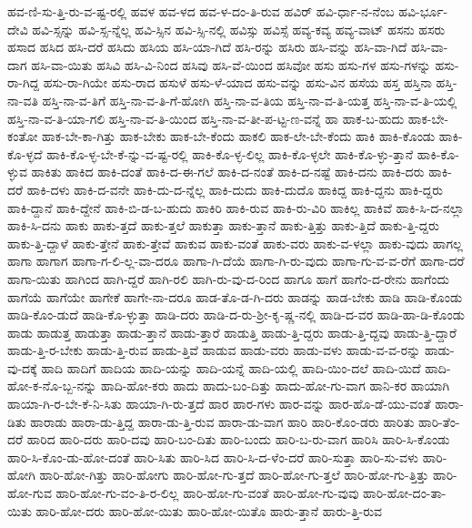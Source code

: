 {ಹವ-ಣಿ-ಸು-ತ್ತಿ-ರು-ವ-ಷ್ಟ-ರಲ್ಲಿ
ಹವಳ
ಹವ-ಳದ
ಹವ-ಳ-ದಂ-ತಿ-ರುವ
ಹವಿರ್
ಹವಿ-ರ್ಧಾ-ನ-ನೆಂಬ
ಹವಿ-ರ್ಭೂ-ದೇವಿ
ಹವಿ-ಸ್ಸನ್ನು
ಹವಿ-ಸ್ಸ-ನ್ನೆಲ್ಲ
ಹವಿ-ಸ್ಸಿನ
ಹವಿ-ಸ್ಸಿ-ನಲ್ಲಿ
ಹವಿಸ್ಸು
ಹವಿಸ್ಸೆ
ಹವ್ಯ-ಕವ್ಯ
ಹವ್ಯ-ವಾಟ್
ಹಸನು
ಹಸರು
ಹಸಾದ
ಹಸಿದ
ಹಸಿ-ದರೆ
ಹಸಿದು
ಹಸಿಯ
ಹಸಿ-ಯಾ-ಗಿದೆ
ಹಸಿ-ರನ್ನು
ಹಸಿರು
ಹಸಿ-ವನ್ನು
ಹಸಿ-ವಾ-ಗಿದೆ
ಹಸಿ-ವಾ-ದಾಗ
ಹಸಿ-ವಾ-ಯಿತು
ಹಸಿವಿ
ಹಸಿ-ವಿ-ನಿಂದ
ಹಸಿವು
ಹಸಿ-ವೆ-ಯಿಂದ
ಹಸಿವೋ
ಹಸು
ಹಸು-ಗಳ
ಹಸು-ಗಳನ್ನು
ಹಸು-ರಾ-ಗಿದ್ದ
ಹಸು-ರಾ-ಗಿಯೇ
ಹಸು-ರಾದ
ಹಸುಳೆ
ಹಸು-ಳೆ-ಯಾದ
ಹಸು-ವನ್ನು
ಹಸು-ವಿನ
ಹಸೆಯ
ಹಸ್ತ
ಹಸ್ತಿನಾ
ಹಸ್ತಿ-ನಾ-ವತಿ
ಹಸ್ತಿ-ನಾ-ವ-ತಿಗೆ
ಹಸ್ತಿ-ನಾ-ವ-ತಿ-ಗೆ-ಹೋಗಿ
ಹಸ್ತಿ-ನಾ-ವ-ತಿಯ
ಹಸ್ತಿ-ನಾ-ವ-ತಿ-ಯತ್ತ
ಹಸ್ತಿ-ನಾ-ವ-ತಿ-ಯಲ್ಲಿ
ಹಸ್ತಿ-ನಾ-ವ-ತಿ-ಯಾ-ಗಲಿ
ಹಸ್ತಿ-ನಾ-ವ-ತಿ-ಯಿಂದ
ಹಸ್ತಿ-ನಾ-ವ-ತೀ-ಪ-ಟ್ಟ-ಣ-ವನ್ನೆ
ಹಾ
ಹಾಕ-ಬ-ಹುದು
ಹಾಕ-ಬೇ-ಕಂತೋ
ಹಾಕ-ಬೇ-ಕಾ-ಗಿತ್ತು
ಹಾಕ-ಬೇಕು
ಹಾಕ-ಬೇ-ಕೆಂದು
ಹಾಕಲಿ
ಹಾಕ-ಲೇ-ಬೇ-ಕೆಂದು
ಹಾಕಿ
ಹಾಕಿ-ಕೊಂಡು
ಹಾಕಿ-ಕೊ-ಳ್ಳದೆ
ಹಾಕಿ-ಕೊ-ಳ್ಳ-ಬೇ-ಕೆ-ನ್ನು-ವ-ಷ್ಟ-ರಲ್ಲಿ
ಹಾಕಿ-ಕೊ-ಳ್ಳ-ಲಿಲ್ಲ
ಹಾಕಿ-ಕೊ-ಳ್ಳಲೇ
ಹಾಕಿ-ಕೊ-ಳ್ಳು-ತ್ತಾನೆ
ಹಾಕಿ-ಕೊ-ಳ್ಳುವ
ಹಾಕಿತು
ಹಾಕಿದ
ಹಾಕಿ-ದಂತೆ
ಹಾಕಿ-ದ-ಈ-ಗಲೆ
ಹಾಕಿ-ದ-ನಂತೆ
ಹಾಕಿ-ದ-ನಷ್ಟೆ
ಹಾಕಿ-ದನು
ಹಾಕಿ-ದರು
ಹಾಕಿ-ದರೆ
ಹಾಕಿ-ದಳು
ಹಾಕಿ-ದ-ವನೇ
ಹಾಕಿ-ದು-ದ-ನ್ನೆಲ್ಲ
ಹಾಕಿ-ದುದು
ಹಾಕಿ-ದುದೊ
ಹಾಕಿದ್ದ
ಹಾಕಿ-ದ್ದನು
ಹಾಕಿ-ದ್ದರು
ಹಾಕಿ-ದ್ದಾನೆ
ಹಾಕಿ-ದ್ದೇನೆ
ಹಾಕಿ-ಬಿ-ಡ-ಬ-ಹುದು
ಹಾಕಿರಿ
ಹಾಕಿ-ರುವ
ಹಾಕಿ-ರು-ವಿರಿ
ಹಾಕಿಲ್ಲ
ಹಾಕಿವೆ
ಹಾಕಿ-ಸಿ-ದ-ನಲ್ಲಾ
ಹಾಕಿ-ಸಿ-ದನು
ಹಾಕು
ಹಾಕು-ತ್ತದೆ
ಹಾಕು-ತ್ತಲೆ
ಹಾಕುತ್ತಾ
ಹಾಕು-ತ್ತಾನೆ
ಹಾಕು-ತ್ತಿತ್ತು
ಹಾಕು-ತ್ತಿದೆ
ಹಾಕು-ತ್ತಿ-ದ್ದರು
ಹಾಕು-ತ್ತಿ-ದ್ದಾಳೆ
ಹಾಕು-ತ್ತೇನೆ
ಹಾಕು-ತ್ತೇವೆ
ಹಾಕುವ
ಹಾಕು-ವಂತೆ
ಹಾಕು-ವರು
ಹಾಕು-ವ-ಳಲ್ಲಾ
ಹಾಕು-ವುದು
ಹಾಗಲ್ಲ
ಹಾಗಾ
ಹಾಗಾಗ
ಹಾಗಾ-ಗ-ಲಿ-ಲ್ಲ-ವಾ-ದರೂ
ಹಾಗಾ-ಗಿ-ದೆಯೆ
ಹಾಗಾ-ಗಿ-ರು-ವುದು
ಹಾಗಾ-ಗು-ವ-ವ-ರೆಗೆ
ಹಾಗಾ-ದರೆ
ಹಾಗಾ-ಯಿತು
ಹಾಗಿಂದ
ಹಾಗಿ-ದ್ದರೆ
ಹಾಗಿ-ರಲಿ
ಹಾಗಿ-ರು-ವು-ದ-ರಿಂದ
ಹಾಗೂ
ಹಾಗೆ
ಹಾಗೆಂ-ದ-ರೇನು
ಹಾಗೆಂದು
ಹಾಗೆಯೆ
ಹಾಗೆಯೇ
ಹಾಗೇಕೆ
ಹಾಗೇ-ನಾ-ದರೂ
ಹಾಡ-ತೊ-ಡ-ಗಿ-ದರು
ಹಾಡನ್ನು
ಹಾಡ-ಬೇಕು
ಹಾಡಿ
ಹಾಡಿ-ಕೊಂಡು
ಹಾಡಿ-ಕೊಂ-ಡುದೆ
ಹಾಡಿ-ಕೊ-ಳ್ಳುತ್ತಾ
ಹಾಡಿ-ದರು
ಹಾಡಿ-ದ-ರು-ಶ್ರೀ-ಕೃ-ಷ್ಣ-ನಲ್ಲಿ
ಹಾಡಿ-ದ-ವರ
ಹಾಡಿ-ಹಾ-ಡಿ-ಕೊಂಡು
ಹಾಡು
ಹಾಡುತ್ತ
ಹಾಡುತ್ತಾ
ಹಾಡು-ತ್ತಾನೆ
ಹಾಡು-ತ್ತಾರೆ
ಹಾಡುತ್ತಿ
ಹಾಡು-ತ್ತಿ-ದ್ದರು
ಹಾಡು-ತ್ತಿ-ದ್ದವು
ಹಾಡು-ತ್ತಿ-ದ್ದಾರೆ
ಹಾಡು-ತ್ತಿ-ರ-ಬೇಕು
ಹಾಡು-ತ್ತಿ-ರುವ
ಹಾಡು-ತ್ತಿವೆ
ಹಾಡುವ
ಹಾಡು-ವರು
ಹಾಡು-ವಳು
ಹಾಡು-ವ-ವ-ರನ್ನು
ಹಾಡು-ವು-ದಕ್ಕೆ
ಹಾದಿ
ಹಾದಿಗೆ
ಹಾದಿಯ
ಹಾದಿ-ಯನ್ನು
ಹಾದಿ-ಯನ್ನೆ
ಹಾದಿ-ಯಲ್ಲಿ
ಹಾದಿ-ಯಿಂ-ದಲೆ
ಹಾದಿ-ಯಿದೆ
ಹಾದಿ-ಹೋ-ಕ-ನೊ-ಬ್ಬ-ನನ್ನು
ಹಾದಿ-ಹೋ-ಕರು
ಹಾದು
ಹಾದು-ಬಂ-ದಿತ್ತು
ಹಾದು-ಹೋ-ಗು-ವಾಗ
ಹಾನಿ-ಕರ
ಹಾಯಾಗಿ
ಹಾಯಾ-ಗಿ-ರ-ಬೇ-ಕೆ-ನಿ-ಸಿತು
ಹಾಯಾ-ಗಿ-ರು-ತ್ತದೆ
ಹಾರ
ಹಾರ-ಗಳು
ಹಾರ-ವನ್ನು
ಹಾರ-ಹೊ-ಡೆ-ಯು-ವಂತೆ
ಹಾರಾ-ಡಿತು
ಹಾರಾಡು
ಹಾರಾ-ಡು-ತ್ತಿದ್ದ
ಹಾರಾ-ಡು-ತ್ತಿ-ರುವ
ಹಾರಾ-ಡು-ವಾಗ
ಹಾರಿ
ಹಾರಿ-ಕೊಂ-ಡರು
ಹಾರಿತು
ಹಾರಿ-ತೆಂ-ದರೆ
ಹಾರಿದ
ಹಾರಿ-ದರು
ಹಾರಿ-ದವು
ಹಾರಿ-ಬಂ-ದಿತು
ಹಾರಿ-ಬಂದು
ಹಾರಿ-ಬ-ರು-ವಾಗ
ಹಾರಿಸಿ
ಹಾರಿ-ಸಿ-ಕೊಂಡು
ಹಾರಿ-ಸಿ-ಕೊಂ-ಡು-ಹೋ-ದಂತೆ
ಹಾರಿ-ಸಿತು
ಹಾರಿ-ಸಿದ
ಹಾರಿ-ಸಿ-ದ-ಳೆಂ-ದರೆ
ಹಾರಿ-ಸುತ್ತಾ
ಹಾರಿ-ಸು-ವಳು
ಹಾರಿ-ಹೋಗಿ
ಹಾರಿ-ಹೋ-ಗಿತ್ತು
ಹಾರಿ-ಹೋಗು
ಹಾರಿ-ಹೋ-ಗು-ತ್ತದೆ
ಹಾರಿ-ಹೋ-ಗು-ತ್ತಲೆ
ಹಾರಿ-ಹೋ-ಗು-ತ್ತಿತ್ತು
ಹಾರಿ-ಹೋ-ಗುವ
ಹಾರಿ-ಹೋ-ಗು-ವಂ-ತಿ-ರ-ಲಿಲ್ಲ
ಹಾರಿ-ಹೋ-ಗು-ವಂತೆ
ಹಾರಿ-ಹೋ-ಗು-ವುವು
ಹಾರಿ-ಹೋ-ದಂ-ತಾ-ಯಿತು
ಹಾರಿ-ಹೋ-ದರು
ಹಾರಿ-ಹೋ-ಯಿತು
ಹಾರಿ-ಹೋ-ಯಿತೊ
ಹಾರು-ತ್ತಾನೆ
ಹಾರು-ತ್ತಿ-ರುವ
}
